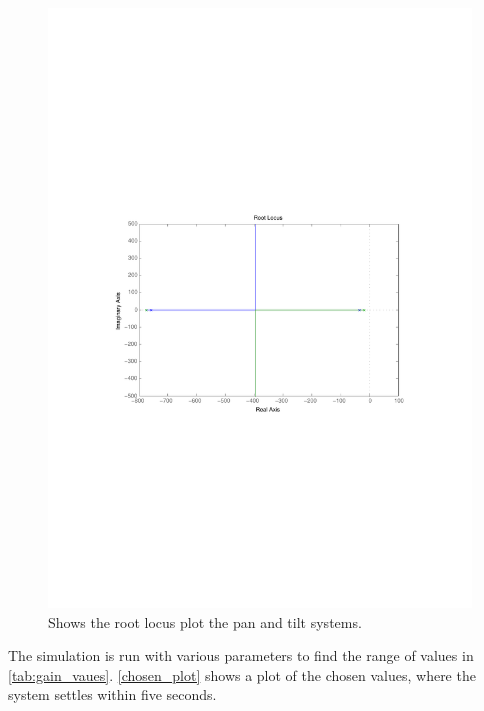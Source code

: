 \begin{figure}[htb]
	\begin{center}
	\includegraphics[scale=1,trim=0 0 0 0]{graphics/rlocus_plot.pdf} %
	\caption{Shows the root locus plot the pan and tilt systems.}
	\label{fig:rlocus_plot}			%
	\end{center}
\end{figure}

The simulation is run with various parameters to find the range of values in \ref{tab:gain_vaues}. \ref{chosen_plot} shows a plot of the chosen values, where the system settles within five seconds.

